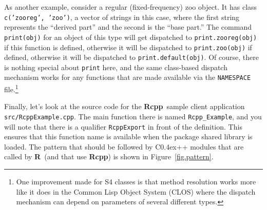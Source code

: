 \documentclass{article}
\def\C++{C{\raise 0.4ex\hbox{\tiny ++}}}
\newcommand{\R}{{\bf R}}
\newcommand{\Rcpp}{{\bf Rcpp}}
\begin{document}
As another example, consider a regular (fixed-frequency) zoo object. It
has class {\tt c('zooreg', 'zoo')}, a vector of strings in this case,
where the first string represents the ``derived part'' and the second
is the ``base part.'' The command {\tt print(obj)} for an object of
this type will get dispatched to {\tt print.zooreg(obj)} if this
function is defined, otherwise it will be dispatched to
{\tt print.zoo(obj)} if defined, otherwise it will be dispatched to
{\tt print.default(obj)}. Of course, there is nothing special
about {\tt print} here, and the same class-based dispatch mechanism works for
any functions that are made available via the {\tt NAMESPACE} 
file.\footnote{One improvement made for S4 classes is that
  method resolution works more like it does in the Common Lisp Object
  System (CLOS) where the dispatch mechanism can depend on parameters of
  several different types.}

Finally, let's look at the source code for the \Rcpp\ sample client
application {\tt src/RcppExample.cpp}. The main function there is
named {\tt Rcpp\_Example}, and you will note that there is a 
qualifier {\tt RcppExport} in front of the definition. This ensures
that this function name is available when the package shared library
is loaded. The pattern that should be followed by \C++ modules that are
called by \R\ (and that use \Rcpp) is shown in Figure~\ref{fig.pattern}.
\end{document}
